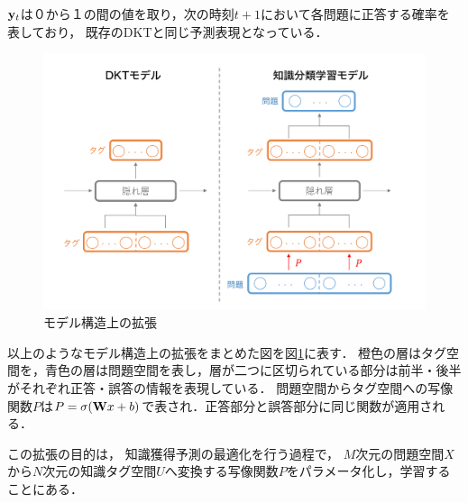 ${\bf y}_t$は０から１の間の値を取り，次の時刻$t+1$において各問題に正答する確率を表しており，
既存のDKTと同じ予測表現となっている．


\begin{figure}[htb]
\begin{center}
	\includegraphics[width=360pt]{./img/model.png}
	\caption{モデル構造上の拡張}
	\label{fig:model}
\end{center}
\end{figure}

以上のようなモデル構造上の拡張をまとめた図を図\ref{fig:model}に表す．
橙色の層はタグ空間を，青色の層は問題空間を表し，層が二つに区切られている部分は前半・後半がそれぞれ正答・誤答の情報を表現している．
問題空間からタグ空間への写像関数$P$は$P=\sigma({\bf W} x + b)$で表され．正答部分と誤答部分に同じ関数が適用される．

この拡張の目的は，
知識獲得予測の最適化を行う過程で，
$M$次元の問題空間$X$から$N$次元の知識タグ空間$U$へ変換する写像関数$P$をパラメータ化し，学習することにある．



